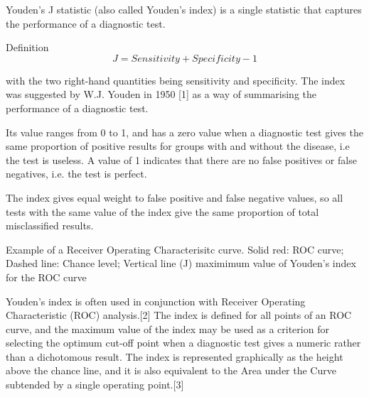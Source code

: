 Youden's J statistic (also called Youden's index) is a single statistic that captures the performance of a diagnostic test.

Definition
\[ J = Sensitivity + Specificity − 1 \]

with the two right-hand quantities being sensitivity and specificity.
The index was suggested by W.J. Youden in 1950 [1] as a way of summarising the performance of a diagnostic test. 

Its value ranges from 0 to 1, and has a zero value when a diagnostic test gives the same proportion of positive results for groups with and without the disease, i.e the test is useless. A value of 1 indicates that there are no false positives or false negatives, i.e. the test is perfect. 

The index gives equal weight to false positive and false negative values, so all tests with the same value of the index give the same proportion of total misclassified results.

Example of a Receiver Operating Characterisitc curve. Solid red: ROC curve; Dashed line: Chance level; Vertical line (J) maximimum value of Youden's index for the ROC curve

Youden's index is often used in conjunction with Receiver Operating Characteristic (ROC) analysis.[2] The index is defined for all points of an ROC curve, and the maximum value of the index may be used as a criterion for selecting the optimum cut-off point when a diagnostic test gives a numeric rather than a dichotomous result. The index is represented graphically as the height above the chance line, and it is also equivalent to the Area under the Curve subtended by a single operating point.[3]
